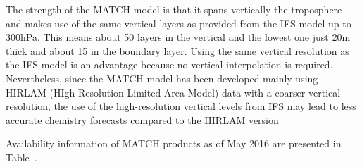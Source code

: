 \documentclass[9pt]{report}
\begin{document}
The strength of the MATCH model is that it spans vertically the troposphere and makes use of the same vertical layers as provided from the IFS model up to 300hPa. This means about 50 layers in the vertical and the lowest one just 20m thick and about 15 in the boundary layer.
Using the same vertical resolution as the IFS model is an advantage because no vertical interpolation is required.
Nevertheless, since the MATCH model has been developed mainly using HIRLAM (HIgh-Resolution Limited Area Model) data with a coarser vertical resolution, the use of the high-resolution vertical levels from IFS may lead to less accurate chemistry forecasts compared to the HIRLAM version%

Availability information of MATCH products as of May 2016 are presented in Table~.%

\begin{table}[h!]%
\begin{mdcenter}%
{}%
\end{mdcenter}\label{match-portfolio}%
\end{table}%
\end{document}
